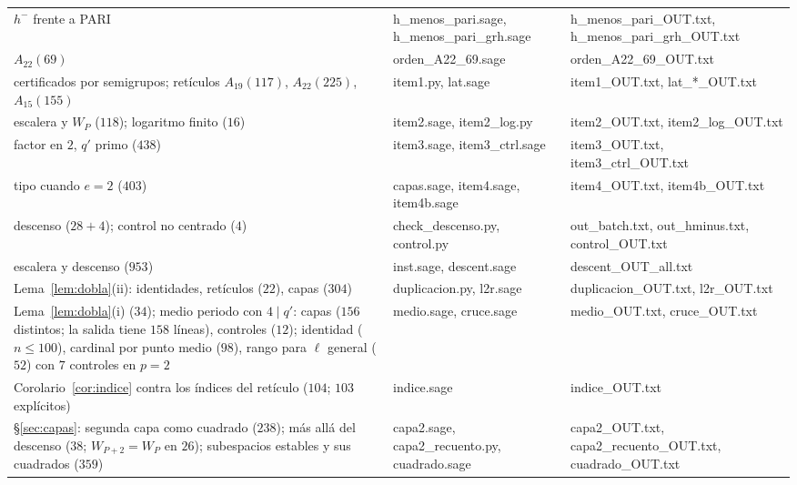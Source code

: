 \documentclass[11pt,a4paper]{article}
\theoremstyle{definition}
\begin{document}
\begin{center}
\begin{tabular}{p{}p{}p{}}
$h^-$ frente a PARI & {\ttfamily\footnotesize h\_menos\_pari.sage, h\_menos\_pari\_grh.sage} & {\ttfamily\footnotesize h\_menos\_pari\_OUT.txt, \allowbreak h\_menos\_pari\_grh\_OUT.txt} \\
$A_{22}(69)$ & {\ttfamily\footnotesize orden\_A22\_69.sage} & {\ttfamily\footnotesize orden\_A22\_69\_OUT.txt} \\
certificados por semigrupos; retículos $A_{19}(117)$, $A_{22}(225)$, $A_{15}(155)$ & {\ttfamily\footnotesize item1.py, lat.sage} & {\ttfamily\footnotesize item1\_OUT.txt, \allowbreak lat\_*\_OUT.txt} \\
escalera y $W_P$ ($118$); logaritmo finito ($16$) & {\ttfamily\footnotesize item2.sage, item2\_log.py} & {\ttfamily\footnotesize item2\_OUT.txt, \allowbreak item2\_log\_OUT.txt} \\
factor en $2$, $q'$ primo ($438$) & {\ttfamily\footnotesize item3.sage, item3\_ctrl.sage} & {\ttfamily\footnotesize item3\_OUT.txt, \allowbreak item3\_ctrl\_OUT.txt} \\
tipo cuando $e=2$ ($403$) & {\ttfamily\footnotesize capas.sage, item4.sage, item4b.sage} & {\ttfamily\footnotesize item4\_OUT.txt, \allowbreak item4b\_OUT.txt} \\
descenso ($28+4$); control no centrado ($4$) & {\ttfamily\footnotesize check\_descenso.py, control.py} & {\ttfamily\footnotesize out\_batch.txt, \allowbreak out\_hminus.txt, \allowbreak control\_OUT.txt} \\
escalera y descenso ($953$) & {\ttfamily\footnotesize inst.sage, descent.sage} & {\ttfamily\footnotesize descent\_OUT\_all.txt} \\
Lema~\ref{lem:dobla}(ii): identidades, retículos ($22$), capas ($304$) & {\ttfamily\footnotesize duplicacion.py, l2r.sage} & {\ttfamily\footnotesize duplicacion\_OUT.txt, \allowbreak l2r\_OUT.txt} \\
Lema~\ref{lem:dobla}(i) ($34$); medio periodo con $4\mid q'$: capas ($156$ distintos; la salida tiene $158$ líneas), controles ($12$); identidad ($n\le100$), cardinal por punto medio ($98$), rango para $\ell$ general ($52$) con $7$ controles en $p=2$ & {\ttfamily\footnotesize medio.sage, cruce.sage} & {\ttfamily\footnotesize medio\_OUT.txt, \allowbreak cruce\_OUT.txt} \\
Corolario~\ref{cor:indice} contra los índices del retículo ($104$; $103$ explícitos) & {\ttfamily\footnotesize indice.sage} & {\ttfamily\footnotesize indice\_OUT.txt} \\
\S\ref{sec:capas}: segunda capa como cuadrado ($238$); más allá del descenso ($38$; $W_{P+2}=W_P$ en $26$); subespacios estables y sus cuadrados ($359$) & {\ttfamily\footnotesize capa2.sage, capa2\_recuento.py, cuadrado.sage} & {\ttfamily\footnotesize capa2\_OUT.txt, \allowbreak capa2\_recuento\_OUT.txt, \allowbreak cuadrado\_OUT.txt} \\
\bottomrule
\end{tabular}
\end{center}
\end{document}
